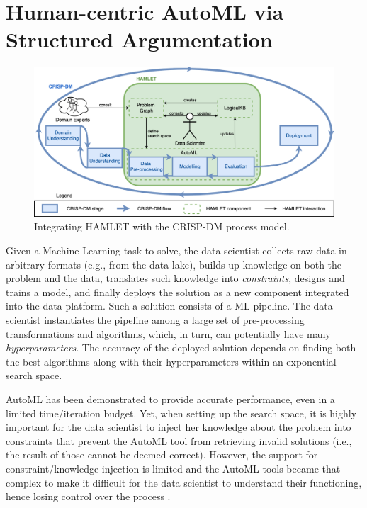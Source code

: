 \chapter{Human-centric AutoML via Structured Argumentation}
\label{human-centric-chap:hamlet}

\begin{figure}[t]
    \centering
    \includegraphics[scale=.25]{chapters/human-centric/hamlet/img/dymmymodel.png}
    \caption{Integrating HAMLET with the CRISP-DM process model.}
    \label{hamlet-fig:approach}
\end{figure}

Given a Machine Learning task to solve, the data scientist collects raw data in arbitrary formats (e.g., from the data lake), builds up knowledge on both the problem and the data, translates such knowledge into \emph{constraints}, designs and trains a model, and finally deploys the solution as a new component integrated into the data platform.
Such a solution consists of a ML pipeline.
The data scientist instantiates the pipeline among a large set of pre-processing transformations and algorithms, which, in turn, can potentially have many \emph{hyperparameters}.
The accuracy of the deployed solution depends on finding both the best algorithms along with their hyperparameters within an exponential search space.

AutoML has been demonstrated to provide accurate performance, even in a limited time/iteration budget.
Yet, when setting up the search space, it is highly important for the data scientist to inject her knowledge about the problem into constraints that prevent the AutoML tool from retrieving invalid solutions (i.e., the result of those cannot be deemed correct).
However, the support for constraint/knowledge injection is limited and the AutoML tools became that complex to make it difficult for the data scientist to understand their functioning, hence losing control over the process \cite{XinWLSP21automationml}.

